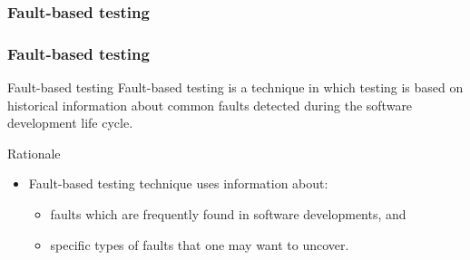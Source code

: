 \begin{frame}[c,parent={cmap:software-testing},hasnext=true,hasprev=true]
\frametitle{Fault-based testing}
\label{cmap:fault-based testing}

\end{frame}


\begin{frame}[c,parent={cmap:fault-based-testing},hasprev=true,hasnext=false]
\frametitle{Fault-based testing}
\label{concept:fault-based-testing}

\begin{block:concept}{Fault-based testing}
Fault-based testing is a technique in which testing is based on historical
information about common faults detected during the software development life
cycle.
\end{block:concept}


\begin{block:fact}{Rationale}
\begin{itemize}
	\item Fault-based testing technique uses information about:
	\begin{itemize}
		\item faults which are frequently found in software developments, and
		\item specific types of faults that one may want to uncover.
	\end{itemize}
\end{itemize}
\end{block:fact}

\end{frame}